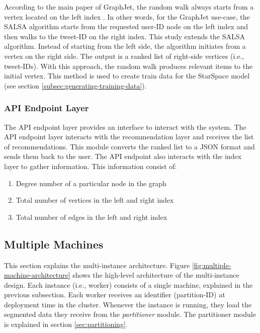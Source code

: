 According to the main paper of GraphJet, the random walk always starts from a vertex located on the left index \cite{sharmaGraphJetRealtimeContent2016}. In other words, for the GraphJet use-case, the SALSA algorithm starts from the requested user-ID node on the left index and then walks to the tweet-ID on the right index. This study extends the SALSA algorithm. Instead of starting from the left side, the algorithm initiates from a vertex on the right side. The output is a ranked list of right-side vertices (i.e., tweet-IDs). With this approach, the random walk produces relevant items to the initial vertex. This method is used to create train data for the StarSpace model (see section \ref{subsec:generating-training-data}).

\subsubsection{API Endpoint Layer}
\label{subsubsec:api-endpoint-layer}
The API endpoint layer provides an interface to interact with the system. The API endpoint layer interacts with the recommendation layer and receives the list of recommendations. This module converts the ranked list to a JSON format and sends them back to the user.
The API endpoint also interacts with the index layer to gather information. This information consist of:

\begin{enumerate}
    \item Degree number of a particular node in the graph
    \item Total number of vertices in the left and right index
    \item Total number of edges in the left and right index
\end{enumerate}

\subsection{Multiple Machines}
\label{subsec:multiple-machines}
This section explains the multi-instance architecture. Figure \ref{fig:multiple-machine-architecture} shows the high-level architecture of the multi-instance design. Each instance (i.e., worker) consists of a single machine, explained in the previous subsection. Each worker receives an identifier (partition-ID) at deployment time in the cluster. Whenever the instance is running, they load the segmented data they receive from the \emph{partitioner} module. The partitioner module is explained in section \ref{sec:partitioning}. 



